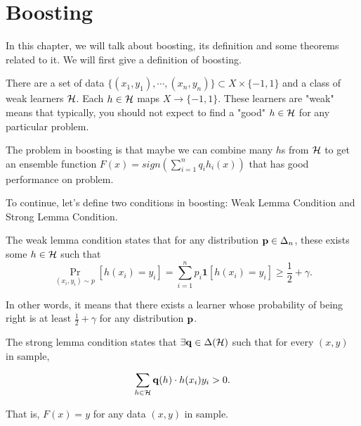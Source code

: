 \documentclass[main.tex]{subfiles}
\begin{document}
\chapter{Boosting}
In this chapter, we will talk about boosting, its definition and some theorems related to it. We will first give a definition of boosting.

\begin{definition}
	There are a set of data $\{(x_1, y_1),\cdots, (x_n, y_n) \} \subset X \times \{-1,1\}$ and a class of weak learners $\mathcal{H}$. Each $h \in \mathcal{H}$ maps $X \to \{-1,1\}$. These learners are "weak" means that typically, you should not expect to find a "good" $h\in \mathcal{H}$ for any particular problem.
	
	The problem in boosting is that maybe we can combine many $h$s from $\mathcal{H}$ to get an ensemble function $F(x) = sign(\sum\limits_{i=1}^n q_ih_i(x))$ that has good performance on problem.
\end{definition}

To continue, let's define two conditions in boosting: Weak Lemma Condition and Strong Lemma Condition.

\begin{definition}
The weak lemma condition states that for any distribution $\mathbf{p} \in \Delta_n$, these exists some $h \in \mathcal{H}$ such that 
\begin{equation}
\Pr\limits_{(x_i,y_i) \sim p} [h(x_i) = y_i] = \sum\limits_{i=1}^n p_i \mathbf{1} [h(x_i) = y_i] \geq \frac{1}{2} + \gamma.
\end{equation}

\end{definition}

In other words, it means that there exists a learner whose probability of being right is at least $\frac{1}{2} + \gamma$ for any distribution $\mathbf{p}$.

\begin{definition}
The strong lemma condition states that $\exists \mathbf{q} \in \Delta (\mathcal{H})$ such that for every $(x,y)$ in sample, 

\begin{equation}
\sum\limits_{h\in \mathcal{H}} \mathbf{q}(h) \cdot h(x_i)y_i > 0.
\end{equation}

That is, $F(x) = y$ for any data $(x,y)$ in sample.


\end{definition}
\end{document}
